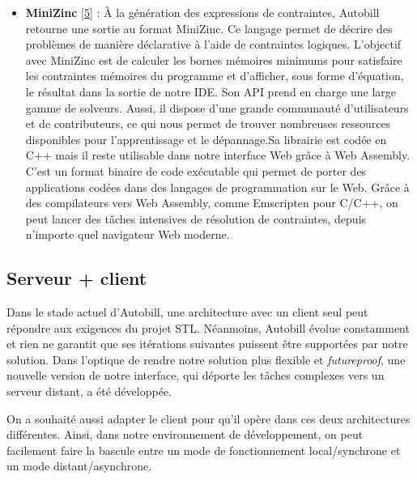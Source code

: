 \documentclass[12pt]{article}
\begin{document}
      \begin{itemize}
            \item
                  \textbf{MiniZinc} \protect\hyperlink{ref-minizinc}{{[}5{]}} : À la
                  génération des expressions de contraintes, Autobill retourne une
                  sortie au format MiniZinc. Ce langage permet de décrire des problèmes
                  de manière déclarative à l'aide de contraintes logiques. L'objectif
                  avec MiniZinc est de calculer les bornes mémoires minimums pour
                  satisfaire les contraintes mémoires du programme et d'afficher, sous
                  forme d'équation, le résultat dans la sortie de notre IDE. Son API
                  prend en charge une large gamme de solveurs. Aussi, il dispose d'une
                  grande communauté d'utilisateurs et de contributeurs, ce qui nous
                  permet de trouver nombreuses ressources disponibles pour
                  l'apprentissage et le dépannage.\newline  Sa librairie est codée en
                  C++ mais il reste utilisable dans notre interface Web grâce à Web
                  Assembly. C'est un format binaire de code exécutable qui permet de
                  porter des applications codées dans des langages de programmation sur
                  le Web. Grâce à des compilateurs vers Web Assembly, comme Emscripten
                  pour C/C++, on peut lancer des tâches intensives de résolution de
                  contraintes, depuis n'importe quel navigateur Web moderne.
      \end{itemize}
\fi

\hypertarget{serveur-client}{%
      \subsection{Serveur + client}\label{serveur-client}}

Dans le stade actuel d'Autobill, une architecture avec un client seul
peut répondre aux exigences du projet STL. Néanmoins, Autobill évolue
constamment et rien ne garantit que ses itérations suivantes puissent
être supportées par notre solution. Dans l'optique de rendre notre
solution plus flexible et \emph{futureproof}, une nouvelle version de
notre interface, qui déporte les tâches complexes vers un serveur
distant, a été développée.

On a souhaité aussi adapter le client pour qu'il opère dans ces deux
architectures différentes. Ainsi, dans notre environnement de
développement, on peut facilement faire la bascule entre un mode de
fonctionnement local/synchrone et un mode distant/asynchrone.
\end{document}
